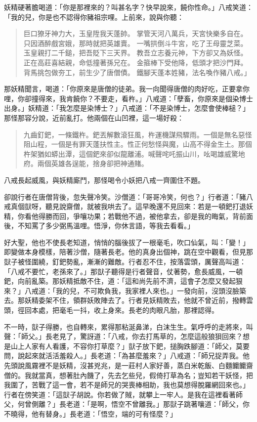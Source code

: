 妖精硬著膽喝道：「你是那裡來的？叫甚名字？快早說來，饒你性命。」八戒笑道：「我的兒，你是也不認得你豬祖宗哩。上前來，說與你聽：
\begin{quote}
巨口獠牙神力大，玉皇陞我天蓬帥。
掌管天河八萬兵，天宮快樂多自在。
只因酒醉戲宮娥，那時就把英雄賣。
一嘴拱倒斗牛宮，吃了王母靈芝菜。
玉皇親打二千鎚，把吾貶下三天界。
教吾立志養元神，下方卻又為妖怪。
正在高莊喜結親，命低撞著孫兄在。
金箍棒下受他降，低頭才把沙門拜。
背馬挑包做夯工，前生少了唐僧債。
鐵腳天蓬本姓豬，法名喚作豬八戒。」
\end{quote}

那妖精聞言，喝道：「你原來是唐僧的徒弟。我一向聞得唐僧的肉好吃，正要拿你哩，你卻撞得來，我肯饒你？不要走，看杵。」八戒道：「孽畜，你原來是個染博士出身。」妖精道：「我怎麼是染博士？」八戒道：「不是染博士，怎麼會使棒槌？」那怪那容分說，近前亂打。他兩個在山凹裡，這一場好殺：
\begin{quote}
九齒釘鈀，一條鐵杵。鈀丟解數滾狂風，杵運機謀飛驟雨。一個是無名惡怪阻山程，一個是有罪天蓬扶性主。性正何愁怪與魔，山高不得金生土。那個杵架猶如蟒出潭，這個鈀來卻似龍離浦。喊聲咤吒振山川，吆喝雄威驚地府。兩個英雄各逞能，捨身卻把神通賭。
\end{quote}

八戒長起威風，與妖精廝鬥，那怪喝令小妖把八戒一齊圍住不題。

卻說行者在唐僧背後，忽失聲冷笑。沙僧道：「哥哥冷笑，何也？」行者道：「豬八戒真個獃呀，聽見說齋僧，就被我哄去了。這早晚還不見回來：若是一頓鈀打退妖精，你看他得勝而回，爭嚷功果；若戰他不過，被他拿去，卻是我的晦氣，背前面後，不知罵了多少弼馬溫哩。悟淨，你休言語，等我去看看。」

好大聖，他也不使長老知道，悄悄的腦後拔了一根毫毛，吹口仙氣，叫：「變！」即變做本身模樣，陪著沙僧，隨著長老。他的真身出個神，跳在空中觀看，但見那獃子被怪圍繞，釘鈀勢亂，漸漸的難敵。行者忍不住，按落雲頭，厲聲高叫道：「八戒不要忙，老孫來了。」那獃子聽得是行者聲音，仗著勢，愈長威風，一頓鈀，向前亂築。那妖精抵敵不住，道：「這和尚先前不濟，這會子怎麼又發起狠來？」八戒道：「我的兒，不可欺負我，我家裡人來也。」一發向前，沒頭沒臉築去。那妖精委架不住，領群妖敗陣去了。行者見妖精敗去，他就不曾近前，撥轉雲頭，徑回本處，把毫毛一抖，收上身來。長老的肉眼凡胎，那裡認得。

不一時，獃子得勝，也自轉來，累得那粘涎鼻涕，白沫生生。氣呼呼的走將來，叫聲：「師父。」長老見了，驚訝道：「八戒，你去打馬草的，怎麼這般狼狽回來？想是山上人家有人看護，不容你打草麼？」獃子放下鈀，搥胸跌腳道：「師父，莫要問，說起來就活活羞殺人。」長老道：「為甚麼羞來？」八戒道：「師兄捉弄我。他先頭說風霧裡不是妖精，沒甚兇兆，是一莊村人家好善，蒸白米乾飯、白麵饝饝齋僧的。我就當真，想著肚內饑了，先去乞些兒，假倚打草為名；豈知若干妖怪，把我圍了，苦戰了這一會，若不是師兄的哭喪棒相助，我也莫想得脫羅網回來也。」行者在傍笑道：「這獃子胡說。你若做了賊，就攀上一牢人。是我在這裡看著師父，何曾側離？」長老道：「是啊，悟空不曾離我。」那獃子跳著嚷道：「師父，你不曉得，他有替身。」長老道：「悟空，端的可有怪麼？」

